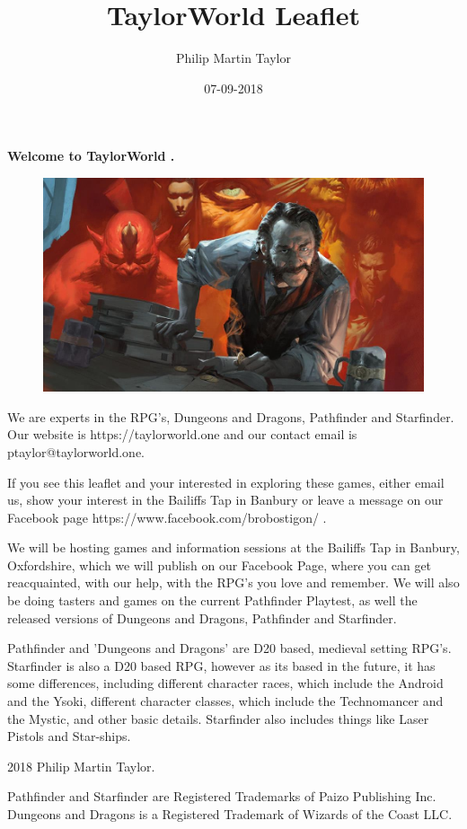 \documentclass[12pt,a4paper]{book}
\date{07-09-2018}
\author{Philip Martin Taylor}
\title{TaylorWorld Leaflet}
\begin{document}
\begin{center}
\textbf{Welcome to TaylorWorld \texttrademark.}
\end{center}
\begin{figure}[h]
  \centering
  \includegraphics[scale=0.15]{alchemist.jpg}
\end{figure}
\begin{flushleft}
We are experts in the RPG's, Dungeons and Dragons, Pathfinder and Starfinder. Our website is https://taylorworld.one and our contact email is ptaylor@taylorworld.one.
\end{flushleft}
\begin{flushleft}
  If you see this leaflet and your interested in exploring these games, either email us, show your interest in the Bailiffs Tap in Banbury or leave a message on our Facebook page https://www.facebook.com/brobostigon/ .
\end{flushleft}
\begin{flushleft}
 We will be hosting games and information sessions at the Bailiffs Tap in Banbury, Oxfordshire, which we will publish on our Facebook Page, where you can get reacquainted, with our help, with the RPG's you love and remember. We will also be doing tasters and games on the current Pathfinder Playtest, as well the released versions of Dungeons and Dragons, Pathfinder and Starfinder.
\end{flushleft}
\begin{flushleft}
  Pathfinder and 'Dungeons and Dragons' are D20 based, medieval setting RPG's. Starfinder is also a D20 based RPG, however as its based in the future, it has some differences, including different character races, which include the Android and the Ysoki, different character classes, which include the Technomancer and the Mystic, and other basic details. Starfinder also includes things like Laser Pistols and Star-ships.
\end{flushleft}
\begin{center}
  \textcopyright{} 2018 Philip Martin Taylor.
\end{center}
\begin{center}
  Pathfinder and Starfinder are Registered Trademarks of Paizo Publishing Inc. Dungeons and Dragons is a Registered Trademark of Wizards of the Coast LLC.
\end{center}
\end{document}
